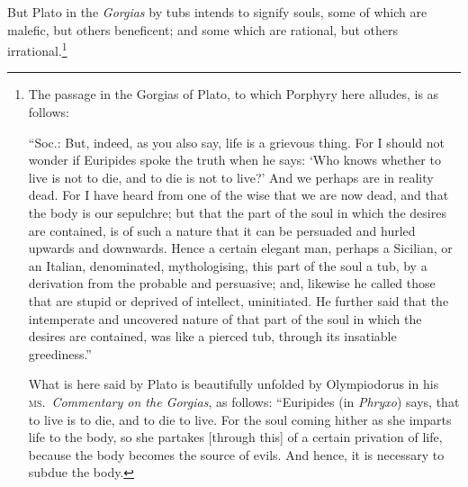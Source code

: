 \documentclass[a4paper,12pt]{article}
\begin{document}
\noindent But Plato in the \textit{Gorgias} by tubs intends to signify souls,
some of which are malefic, but others beneficent; and some which are rational,
but others irrational.\footnote{The passage in the Gorgias of Plato, to which
Porphyry here alludes, is as follows:

``Soc.: But, indeed, as you also say, life is a grievous thing. For I should
not wonder if Euripides spoke the truth when he says: `Who knows whether to
live is not to die, and to die is not to live?' And we perhaps are in reality
dead. For I have heard from one of the wise that we are now dead, and that the
body is our sepulchre; but that the part of the soul in which the desires are
contained, is of such a nature that it can be persuaded and hurled upwards and
downwards. Hence a certain elegant man, perhaps a Sicilian, or an Italian,
denominated, mythologising, this part of the soul a tub, by a derivation from
the probable and persuasive; and, likewise he called those that are stupid or
deprived of intellect, uninitiated. He further said that the intemperate and
uncovered nature of that part of the soul in which the desires are contained,
was like a pierced tub, through its insatiable greediness.''

What is here said by Plato is beautifully unfolded by Olympiodorus in his
\textsc{ms.}~\textit{Commentary on the Gorgias}, as follows: ``Euripides (in
\textit{Phryxo}) says, that to live is to die, and to die to live. For the soul
coming hither as she imparts life to the body, so she partakes [through this]
of a certain privation of life, because the body becomes the source of evils.
And hence, it is necessary to subdue the body.

}
\end{document}
